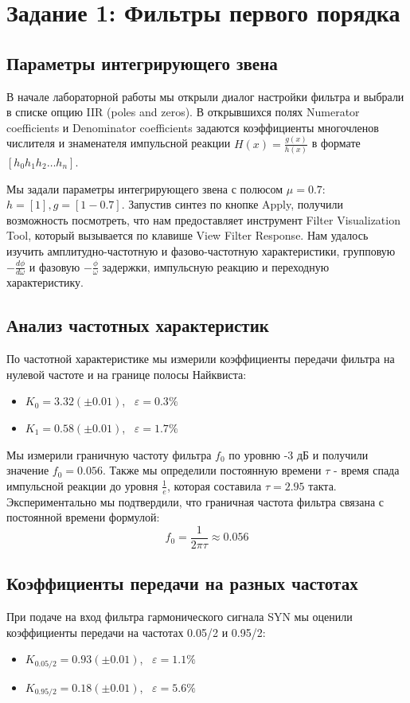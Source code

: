 \section{Задание 1: Фильтры первого порядка}

\subsection{Параметры интегрирующего звена}
В начале лабораторной работы мы открыли диалог настройки фильтра и выбрали в списке опцию IIR (poles and zeros). В открывшихся полях Numerator coefficients и Denominator coefficients задаются коэффициенты многочленов числителя и знаменателя импульсной реакции $H(x) = \frac{g(x)}{h(x)}$ в формате $[h_0 h_1 h_2 \ldots h_n]$.

Мы задали параметры интегрирующего звена с полюсом $\mu = 0.7$: $h = [1], g = [1 - 0.7]$. Запустив синтез по кнопке Apply, получили возможность посмотреть, что нам предоставляет инструмент Filter Visualization Tool, который вызывается по клавише View Filter Response. Нам удалось изучить амплитудно-частотную и фазово-частотную характеристики, групповую $-\frac{d\phi}{d\omega}$ и фазовую $-\frac{\phi}{\omega}$ задержки, импульсную реакцию и переходную характеристику.

\subsection{Анализ частотных характеристик}
По частотной характеристике мы измерили коэффициенты передачи фильтра на нулевой частоте и на границе полосы Найквиста:
\begin{itemize}
    \item $K_0 = 3.32 \left( \pm 0.01 \right)$, \ $\varepsilon = 0.3\%$
    \item $K_1 = 0.58 \left( \pm 0.01 \right)$, \ $\varepsilon = 1.7\%$
\end{itemize}

Мы измерили граничную частоту фильтра $f_0$ по уровню -3 дБ и получили значение $f_0 = 0.056$. Также мы определили постоянную времени $\tau$ - время спада импульсной реакции до уровня $\frac{1}{e}$, которая составила $\tau = 2.95$ такта. Экспериментально мы подтвердили, что граничная частота фильтра связана с постоянной времени формулой:
\[f_0 = \frac{1}{2\pi \tau} \approx 0.056\]

\subsection{Коэффициенты передачи на разных частотах}
При подаче на вход фильтра гармонического сигнала SYN мы оценили коэффициенты передачи на частотах 0.05/2 и 0.95/2:
\begin{itemize}
    \item $K_{0.05/2} = 0.93 \left( \pm 0.01 \right)$, \ $\varepsilon = 1.1\%$
    \item $K_{0.95/2} = 0.18 \left( \pm 0.01 \right)$, \ $\varepsilon = 5.6\%$
\end{itemize}

